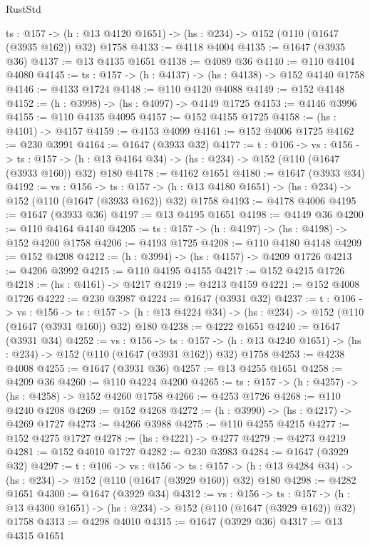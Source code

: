 \begin{lexlean}{RustStd}
\begin{coremodule}
  {ts : @157} -> (h : @13 @4120 @1651) -> (hs : @234) -> @152 (@110 (@1647 (@3935 @162)) @32) @1758
@4133 := @4118 @4004
@4135 := @1647 (@3935 @36)
@4137 := @13 @4135 @1651
@4138 := @4089 @36
@4140 := @110 @4104 @4080
@4145 := {ts : @157} -> (h : @4137) -> (hs : @4138) -> @152 @4140 @1758
@4146 := @4133 @1724
@4148 := @110 @4120 @4088
@4149 := @152 @4148
@4152 := (h : @3998) -> (hs : @4097) -> @4149 @1725
@4153 := @4146 @3996
@4155 := @110 @4135 @4095
@4157 := @152 @4155 @1725
@4158 := (hs : @4101) -> @4157
@4159 := @4153 @4099
@4161 := @152 @4006 @1725
@4162 := @230 @3991
@4164 := @1647 (@3933 @32)
@4177 := {t : @106} ->
  {vs : @156} ->
  {ts : @157} -> (h : @13 @4164 @34) -> (hs : @234) -> @152 (@110 (@1647 (@3933 @160)) @32) @180
@4178 := @4162 @1651
@4180 := @1647 (@3933 @34)
@4192 := {vs : @156} ->
  {ts : @157} -> (h : @13 @4180 @1651) -> (hs : @234) -> @152 (@110 (@1647 (@3933 @162)) @32) @1758
@4193 := @4178 @4006
@4195 := @1647 (@3933 @36)
@4197 := @13 @4195 @1651
@4198 := @4149 @36
@4200 := @110 @4164 @4140
@4205 := {ts : @157} -> (h : @4197) -> (hs : @4198) -> @152 @4200 @1758
@4206 := @4193 @1725
@4208 := @110 @4180 @4148
@4209 := @152 @4208
@4212 := (h : @3994) -> (hs : @4157) -> @4209 @1726
@4213 := @4206 @3992
@4215 := @110 @4195 @4155
@4217 := @152 @4215 @1726
@4218 := (hs : @4161) -> @4217
@4219 := @4213 @4159
@4221 := @152 @4008 @1726
@4222 := @230 @3987
@4224 := @1647 (@3931 @32)
@4237 := {t : @106} ->
  {vs : @156} ->
  {ts : @157} -> (h : @13 @4224 @34) -> (hs : @234) -> @152 (@110 (@1647 (@3931 @160)) @32) @180
@4238 := @4222 @1651
@4240 := @1647 (@3931 @34)
@4252 := {vs : @156} ->
  {ts : @157} -> (h : @13 @4240 @1651) -> (hs : @234) -> @152 (@110 (@1647 (@3931 @162)) @32) @1758
@4253 := @4238 @4008
@4255 := @1647 (@3931 @36)
@4257 := @13 @4255 @1651
@4258 := @4209 @36
@4260 := @110 @4224 @4200
@4265 := {ts : @157} -> (h : @4257) -> (hs : @4258) -> @152 @4260 @1758
@4266 := @4253 @1726
@4268 := @110 @4240 @4208
@4269 := @152 @4268
@4272 := (h : @3990) -> (hs : @4217) -> @4269 @1727
@4273 := @4266 @3988
@4275 := @110 @4255 @4215
@4277 := @152 @4275 @1727
@4278 := (hs : @4221) -> @4277
@4279 := @4273 @4219
@4281 := @152 @4010 @1727
@4282 := @230 @3983
@4284 := @1647 (@3929 @32)
@4297 := {t : @106} ->
  {vs : @156} ->
  {ts : @157} -> (h : @13 @4284 @34) -> (hs : @234) -> @152 (@110 (@1647 (@3929 @160)) @32) @180
@4298 := @4282 @1651
@4300 := @1647 (@3929 @34)
@4312 := {vs : @156} ->
  {ts : @157} -> (h : @13 @4300 @1651) -> (hs : @234) -> @152 (@110 (@1647 (@3929 @162)) @32) @1758
@4313 := @4298 @4010
@4315 := @1647 (@3929 @36)
@4317 := @13 @4315 @1651

\end{coremodule}
\end{lexlean}
